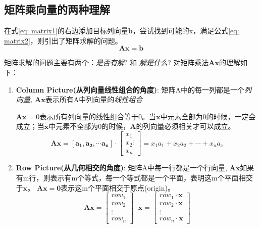 \documentclass{book}
\begin{document}
\subsection{矩阵乘向量的两种理解}

在式\ref{eq: matrix1}的右边添加目标列向量$\boldsymbol{b}$，尝试找到可能的x，满足公式\ref{eq: matrix2}，则引出了矩阵求解的问题。
\begin{equation}
  \boldsymbol{Ax}=\boldsymbol{b}
  \label{eq: matrix2}
\end{equation}

矩阵求解的问题主要有两个：\textit{是否有解}? 和 \textit{解是什么}? 
对矩阵乘法$\boldsymbol{Ax}$的理解如下：
\begin{enumerate}
  \item \textbf{Column Picture(从列向量线性组合的角度)}: 矩阵A中的每一列都是一个\textit{列向量, $\boldsymbol{Ax}$}表示所有A中列向量的\textit{线性组合} 

    $\boldsymbol{Ax}=0$表示所有列向量的线性组合等于0。当$\boldsymbol{x}$中元素全部为0的时候，一定会成立；当$\boldsymbol{x}$中元素不全部为0的时候，$\boldsymbol{A}$的列向量必须相关才可以成立。
        \begin{equation}
          \boldsymbol{Ax}=\left[\boldsymbol{a_1, a_2}, \cdots \boldsymbol{a_n}\right]\cdot\left[
            \begin{array}{c}
              x_1\\x_2 \vdots \\x_n
            \end{array}\right]=x_1a_1+x_2a_2+\cdots+x_na_x
          \label{eq: columnPic}
        \end{equation}
      \item \textbf{Row Picture(从几何相交的角度)}:  矩阵A中每一行都是一个行向量, $\boldsymbol{Ax}$如果有m行，则表示有m个等式，每一个等式都是一个平面，表明这m个平面相交于$\boldsymbol{x}$。
        $\boldsymbol{Ax}=\boldsymbol{0}$表示这m个平面相交于原点(origin)。
        \begin{equation}
          \boldsymbol{Ax}=\left[
            \begin{array}{c}
              row_1 \\ 
              row_2 \\ 
              \vdots\\ 
              row_n
            \end{array}
            \right]\cdot \boldsymbol{x}=
          \left[
            \begin{array}{c}
              row_1\cdot\boldsymbol{x}\\ 
              row_2\cdot\boldsymbol{x} \\ 
              \vdots\\ 
              row_n\cdot\boldsymbol{x}
            \end{array}
            \right]
          \label{eq: rowPic}
        \end{equation}
\end{enumerate}
\end{document}
